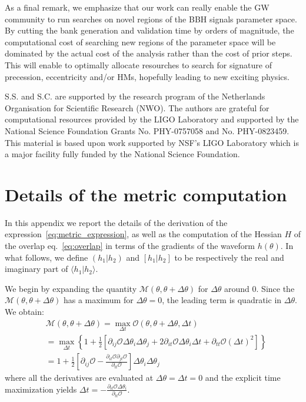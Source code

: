 \documentclass[twocolumn,showpacs,preprintnumbers,nofootinbib,prd,
superscriptaddress,10pt]{revtex4-2}
\newcommand{\scalar}[2]{\langle #1|#2 \rangle}
\newcommand{\rescalar}[2]{( #1|#2 )}
\newcommand{\imscalar}[2]{[ #1|#2 ]}
\begin{document}
As a final remark, we emphasize that our work can really enable the GW community to run searches on novel regions of the BBH signals parameter space. By cutting the bank generation and validation time by orders of magnitude, the computational cost of searching new regions of the parameter space will be dominated by the actual cost of the analysis rather than the cost of prior steps.
This will enable to optimally allocate resourches to search for signature of precession, eccentricity and/or HMs, hopefully leading to new exciting physics.

        \begin{acknowledgments}
		S.S. and S.C. are supported by the research program of the Netherlands Organisation for Scientific Research (NWO).
		The authors are grateful for computational resources provided by the LIGO Laboratory and supported by the National Science Foundation Grants No. PHY-0757058 and No. PHY-0823459. This material is based upon work supported by NSF’s LIGO Laboratory which is a major facility fully funded by the National Science Foundation.
        \end{acknowledgments}

\newpage
\appendix
\section{Details of the metric computation}\label{app:metric}

In this appendix we report the details of the derivation of the expression~\eqref{eq:metric_expression}, as well as the computation of the Hessian $H$ of the overlap eq.~\eqref{eq:overlap} in terms of the gradients of the waveform $h(\theta)$. 
In what follows, we define $\rescalar{h_1}{h_2}$ and $\imscalar{h_1}{h_2}$ to be respectively the real and imaginary part of $\scalar{h_1}{h_2}$.

We begin by expanding the quantity $\mathcal{M}(\theta,\theta +\Delta\theta)$ for $\Delta\theta$ around $0$. Since the $\mathcal{M}(\theta,\theta +\Delta\theta)$ has a maximum for $\Delta\theta = 0$, the leading term is quadratic in $\Delta\theta$.
We obtain:
\begin{align} \label{eq:metric_derivation}
	&\mathcal{M}(\theta,\theta +\Delta\theta) = \max_{\Delta t} \mathcal{O}(\theta, \theta + \Delta\theta, \Delta t) \nonumber\\
	& =	\max_{\Delta t} \left\{ 1+ \frac{1}{2}\left[ \partial_{ij}\mathcal{O} \Delta\theta_i \Delta\theta_j + 2  \partial_{it}\mathcal{O} \Delta\theta_i \Delta t + \partial_{tt}\mathcal{O} (\Delta t)^2 \right] \right\}  \nonumber \\
	&= 1 + \frac{1}{2}\left[ \partial_{ij}\mathcal{O} - \frac{\partial_{it}\mathcal{O} \partial_{jt}\mathcal{O}}{\partial_{tt}\mathcal{O}}\right] \Delta\theta_i \Delta\theta_j
\end{align}
where all the derivatives are evaluated at ${\Delta\theta = \Delta t = 0}$ and the explicit time maximization yields
${\Delta t = -\frac{\partial_{it}\mathcal{O} \Delta\theta_i}{\partial_{tt}\mathcal{O}}}$.
\end{document}
